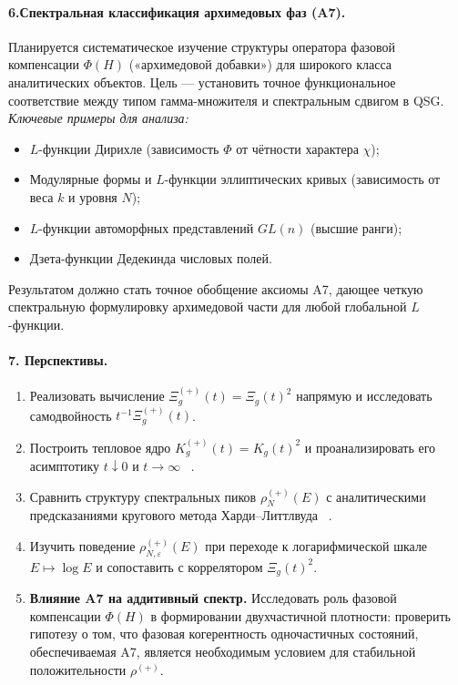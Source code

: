 \documentclass{article}
\numberwithin{equation}{section}
\theoremstyle{plain}
\theoremstyle{definition}
\theoremstyle{remark}
\def\rho{ρ}\def\sigma{σ}\def\Sigma{Σ}\def\tau{τ}%
\def\infty{∞}\def\partial{∂}\def\sum{Σ}\def\int{∫}%
\begin{document}
\paragraph{6.Спектральная классификация архимедовых фаз (A7).}
Планируется систематическое изучение структуры оператора фазовой компенсации $\Phi(H)$ («архимедовой добавки») для широкого класса аналитических объектов. Цель — установить точное функциональное соответствие между типом гамма-множителя и спектральным сдвигом в QSG.
\emph{Ключевые примеры для анализа:}
\begin{itemize}
    \item $L$-функции Дирихле (зависимость $\Phi$ от чётности характера $\chi$);
    \item Модулярные формы и $L$-функции эллиптических кривых (зависимость от веса $k$ и уровня $N$);
    \item $L$-функции автоморфных представлений $GL(n)$ (высшие ранги);
    \item Дзета-функции Дедекинда числовых полей.
\end{itemize}
Результатом должно стать точное обобщение аксиомы A7, дающее четкую спектральную формулировку архимедовой части для любой глобальной $L$-функции.

\paragraph{7. Перспективы.}
\begin{enumerate}
\item Реализовать вычисление \(\Xi^{(+)}_g(t)=\Xi_g(t)^2\) напрямую и исследовать самодвойность \(t^{-1}\Xi^{(+)}_g(t)\).
\item Построить тепловое ядро \(K^{(+)}_g(t)=K_g(t)^2\) и проанализировать его асимптотику \(t\downarrow 0\) и \(t\to\infty\) ~\cite{Vassilevich2003}.
\item Сравнить структуру спектральных пиков \(\rho^{(+)}_N(E)\) с аналитическими предсказаниями кругового метода Харди–Литтлвуда ~\cite{IwaniecKowalski2004, Vaughan1997}.
\item Изучить поведение \(\rho^{(+)}_{N,\varepsilon}(E)\) при переходе к логарифмической шкале \(E\mapsto\log E\) и сопоставить с коррелятором \(\Xi_g(t)^2\).
\item \textbf{Влияние A7 на аддитивный спектр.} Исследовать роль фазовой компенсации $\Phi(H)$ в формировании двухчастичной плотности: проверить гипотезу о том, что фазовая когерентность одночастичных состояний, обеспечиваемая A7, является необходимым условием для стабильной положительности $\rho^{(+)}$.
\end{enumerate}
\end{document}
